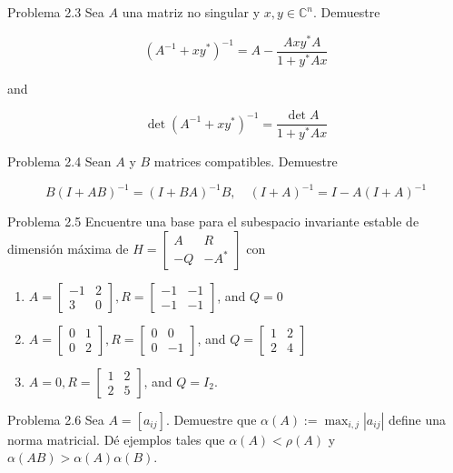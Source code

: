 \documentclass[11pt]{article}
\begin{document}
Problema 2.3 Sea $A$ una matriz no singular y $x, y \in \mathbb{C}^{n}$. Demuestre

$$
\left(A^{-1}+x y^{*}\right)^{-1}=A-\frac{A x y^{*} A}{1+y^{*} A x}
$$

and

$$
\operatorname{det}\left(A^{-1}+x y^{*}\right)^{-1}=\frac{\operatorname{det} A}{1+y^{*} A x}
$$

Problema 2.4 Sean $A$ y $B$ matrices compatibles. Demuestre

$$
B(I+A B)^{-1}=(I+B A)^{-1} B, \quad(I+A)^{-1}=I-A(I+A)^{-1}
$$

Problema 2.5 Encuentre una base para el subespacio invariante estable de dimensión máxima de $H=\left[\begin{array}{cc}A & R \\ -Q & -A^{*}\end{array}\right]$ con

\begin{enumerate}
  \item $A=\left[\begin{array}{cc}-1 & 2 \\ 3 & 0\end{array}\right], R=\left[\begin{array}{cc}-1 & -1 \\ -1 & -1\end{array}\right]$, and $Q=0$
  \item $A=\left[\begin{array}{ll}0 & 1 \\ 0 & 2\end{array}\right], R=\left[\begin{array}{cc}0 & 0 \\ 0 & -1\end{array}\right]$, and $Q=\left[\begin{array}{ll}1 & 2 \\ 2 & 4\end{array}\right]$
  \item $A=0, R=\left[\begin{array}{ll}1 & 2 \\ 2 & 5\end{array}\right]$, and $Q=I_{2}$.
\end{enumerate}

Problema 2.6 Sea $A=\left[a_{i j}\right]$. Demuestre que $\alpha(A):=\max _{i, j}\left|a_{i j}\right|$ define una norma matricial. Dé ejemplos tales que $\alpha(A)<\rho(A)$ y $\alpha(A B)>\alpha(A) \alpha(B)$.
\end{document}

